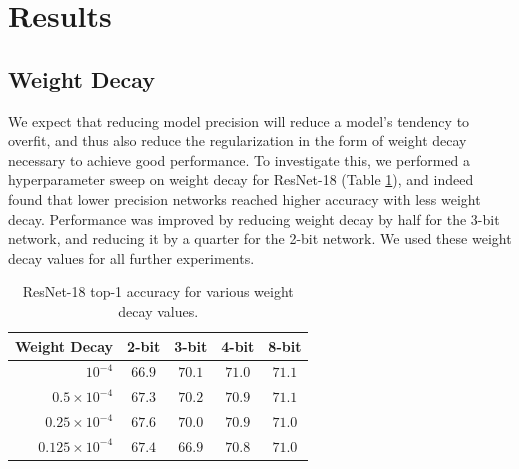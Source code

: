 \documentclass{article}
\begin{document}
\section{Results}


\subsection{Weight Decay}

We expect that reducing model precision will reduce a model's tendency to overfit, and thus also reduce the regularization in the form of weight decay necessary to achieve good performance.
%
To investigate this, we performed a hyperparameter sweep on weight decay for ResNet-18 (Table  \ref{table:weightdecay}),
and indeed found that lower precision networks reached higher accuracy with less weight decay.
Performance was improved by reducing weight decay by half for the 3-bit network, and reducing it by a quarter for the 2-bit network. We used these weight decay values for all further experiments.

\begin{table}[h]
	\caption{ResNet-18 top-1 accuracy for various weight decay values.}
	\label{table:weightdecay}
	\setlength\tabcolsep{6pt}
	\begin{center}
	\begin{small}
	\begin{tabular}{r c c c c}
		Weight Decay & 2-bit & 3-bit & 4-bit & 8-bit \\
		\midrule
		$10^{-4}$ 				& $66.9$ 			& $70.1$ 			& $\mathbf{71.0}$	& $\mathbf{71.1}$ \\
		$0.5 \times 10^{-4}$ 		& $67.3$ 			& $\mathbf{70.2}$ 	& $70.9$			& $71.1$ \\
		$0.25 \times 10^{-4}$ 	& $\mathbf{67.6}$ 	& $70.0$ 			& $70.9$ 			& $71.0$ \\
		$0.125 \times 10^{-4}$ 	& $67.4$ 			& $66.9$ 			& $70.8$ 			& $71.0$ \\
		\bottomrule
	\end{tabular}
	\end{small}
	\end{center}
\end{table}
\end{document}
